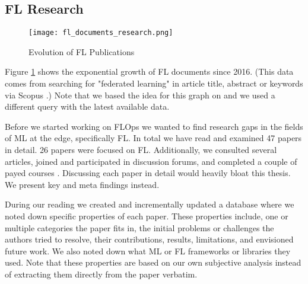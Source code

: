 %
%
%
\subsection{FL Research}\label{subsection:fl_research}

\begin{figure}[h]
    \centering
    \texttt{[image: fl\_documents\_research.png]}
    \caption{Evolution of FL Publications}
    \label{fig:fl_documents_research}
\end{figure}

Figure \ref{fig:fl_documents_research} shows the exponential growth of FL documents
since 2016. (This data comes from searching for "federated learning" in article title, abstract or keywords via Scopus \cite{scopus_homepage}.)
Note that we based the idea for this graph on \cite{thesis:tum_fl_framework_comparison}
and we used a different query with the latest available data.

Before we started working on FLOps we wanted to find research gaps in the fields of 
ML at the edge, specifically FL.
In total we have read and examined 47 papers in detail. 
26 papers were focused on FL. 
Additionally, we consulted several articles,
joined and participated in discussion forums,
and completed a couple of payed courses \cite{udemy_homepage}.
Discussing each paper in detail would heavily bloat this thesis.
We present key and meta findings instead.

During our reading we created and incrementally updated a database where we noted down
specific properties of each paper.
These properties include, one or multiple categories the paper fits in, the initial problems or challenges the authors tried to resolve,
their contributions, results, limitations, and envisioned future work.
We also noted down what ML or FL frameworks or libraries they used.
Note that these properties are based on our own subjective analysis instead of extracting them directly from the paper verbatim.

